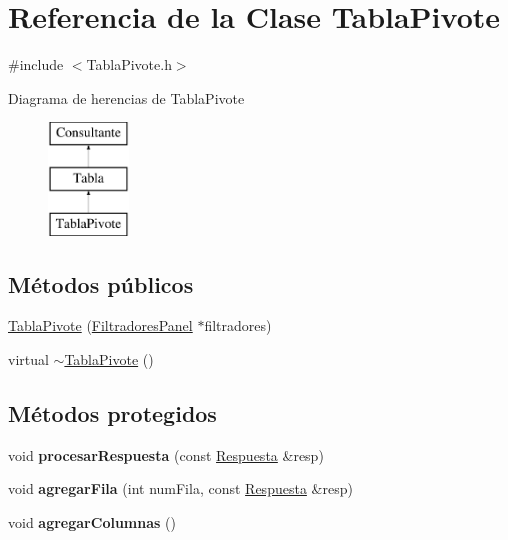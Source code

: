 \hypertarget{classTablaPivote}{\section{\-Referencia de la \-Clase \-Tabla\-Pivote}
\label{classTablaPivote}
}


{\ttfamily \#include $<$\-Tabla\-Pivote.\-h$>$}

\-Diagrama de herencias de \-Tabla\-Pivote\begin{figure}[H]
\begin{center}
\leavevmode
\includegraphics[height=3.000000cm]{classTablaPivote}
\end{center}
\end{figure}
\subsection*{\-Métodos públicos}
\begin{DoxyCompactItemize}
\item 
\hyperlink{classTablaPivote_a0c1f582c43a0da4cd69a200afd43fe7c}{\-Tabla\-Pivote} (\hyperlink{classFiltradoresPanel}{\-Filtradores\-Panel} $\ast$filtradores)
\item 
virtual \hyperlink{classTablaPivote_a517a58ffc44a59f0f5b44f3a3e8abfdb}{$\sim$\-Tabla\-Pivote} ()
\end{DoxyCompactItemize}
\subsection*{\-Métodos protegidos}
\begin{DoxyCompactItemize}
\item 
\hypertarget{classTablaPivote_adedcceb92d1a6636a64567bb934e0e7b}{void {\bfseries procesar\-Respuesta} (const \hyperlink{classRespuesta}{\-Respuesta} \&resp)}\label{classTablaPivote_adedcceb92d1a6636a64567bb934e0e7b}

\item 
\hypertarget{classTablaPivote_afd3fd4d9de59c9decdbffab5c2e6d61a}{void {\bfseries agregar\-Fila} (int num\-Fila, const \hyperlink{classRespuesta}{\-Respuesta} \&resp)}\label{classTablaPivote_afd3fd4d9de59c9decdbffab5c2e6d61a}

\item 
\hypertarget{classTablaPivote_af114fa051b952361bf839a8ae490de23}{void {\bfseries agregar\-Columnas} ()}\label{classTablaPivote_af114fa051b952361bf839a8ae490de23}

\end{DoxyCompactItemize}
